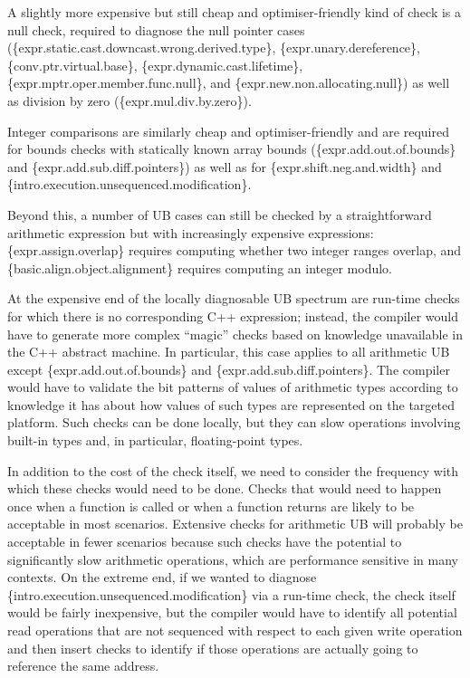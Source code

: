 A slightly more expensive but still cheap and optimiser-friendly kind of check is a null check, required to diagnose the null pointer cases  
(\{expr.static.cast.downcast.wrong.derived.type\},
\{expr.unary.deref\-erence\},
\{conv.ptr.virtual.base\},
\{expr.dynamic.cast.lifetime\}, 
\{expr.mptr.oper.member.\linebreak[3]func.null\}, and
\{expr.new.non.allocating.null\})
as well as division by zero (\{expr.mul.div.by.zero\}).

Integer comparisons are similarly cheap and optimiser-friendly and are   required for bounds checks with statically known array bounds
(\{expr.add.out.of.bounds\} and
\{expr.add.sub.diff.pointers\})
as well as for \{expr.shift.neg.and.width\} 
and \{intro.execution.unsequenced.modification\}.

Beyond this, a number of UB cases can still be checked by a straightforward arithmetic expression but with increasingly expensive expressions: \{expr.assign.overlap\} requires computing whether two integer ranges overlap, and  \{basic.align.object.alignment\} requires computing an integer modulo. 

At the expensive end of the locally diagnosable UB spectrum are run-time checks for which there is no corresponding C++ expression; instead, the compiler would have to generate more complex ``magic'' checks based on knowledge unavailable in the C++ abstract machine. In particular, this case applies to all arithmetic UB except \{expr.add.out.of.bounds\} and
\{expr.add.sub.diff.pointers\}. The compiler would have to validate the bit patterns of values of arithmetic types according to knowledge it has about how values of such types are represented on the targeted platform. Such checks can be done locally, but they can slow operations involving built-in types and, in particular, floating-point types.

In addition to the cost of the check itself, we need to consider the frequency with which these checks would need to be done. Checks that would need to happen once when a function is called or when a function returns are likely to be acceptable in most scenarios. Extensive checks for arithmetic UB will probably be acceptable in fewer scenarios because such checks have the potential to significantly slow arithmetic operations, which are performance sensitive in many contexts. On the extreme end, if we wanted to diagnose \{intro.execution.unsequenced.modification\} via a run-time check, the check itself would be fairly inexpensive, but the compiler would have to identify all potential read operations that are not sequenced with respect to each given write operation and then insert checks to identify if those operations are actually going to reference the same address.

